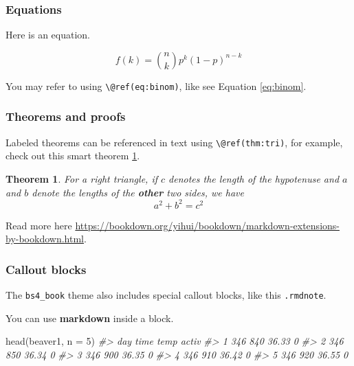 \documentclass[
]{bxjsbook}
\newenvironment{Shaded}{\begin{snugshade}}{\end{snugshade}}
\newcommand{\AttributeTok}[1]{\textcolor[rgb]{0.77,0.63,0.00}{#1}}
\newcommand{\CommentTok}[1]{\textcolor[rgb]{0.56,0.35,0.01}{\textit{#1}}}
\newcommand{\DecValTok}[1]{\textcolor[rgb]{0.00,0.00,0.81}{#1}}
\newcommand{\FunctionTok}[1]{\textcolor[rgb]{0.00,0.00,0.00}{#1}}
\newcommand{\NormalTok}[1]{#1}
\newtheorem{theorem}{Theorem}[section]
\theoremstyle{definition}
\theoremstyle{definition}
\theoremstyle{definition}
\theoremstyle{definition}
\theoremstyle{remark}
\begin{document}
\hypertarget{equations}{%
\subsubsection{Equations}\label{equations}}

Here is an equation.

\begin{equation} 
  f\left(k\right) = \binom{n}{k} p^k\left(1-p\right)^{n-k}
  \label{eq:binom}
\end{equation}

You may refer to using \texttt{\textbackslash{}@ref(eq:binom)}, like see Equation \eqref{eq:binom}.

\hypertarget{theorems-and-proofs}{%
\subsubsection{Theorems and proofs}\label{theorems-and-proofs}}

Labeled theorems can be referenced in text using \texttt{\textbackslash{}@ref(thm:tri)}, for example, check out this smart theorem \ref{thm:tri}.

\begin{theorem}
\protect\hypertarget{thm:tri}{}\label{thm:tri}For a right triangle, if \(c\) denotes the \emph{length} of the hypotenuse
and \(a\) and \(b\) denote the lengths of the \textbf{other} two sides, we have
\[a^2 + b^2 = c^2\]
\end{theorem}

Read more here \url{https://bookdown.org/yihui/bookdown/markdown-extensions-by-bookdown.html}.

\hypertarget{callout-blocks}{%
\subsubsection{Callout blocks}\label{callout-blocks}}

The \texttt{bs4\_book} theme also includes special callout blocks, like this \texttt{.rmdnote}.

You can use \textbf{markdown} inside a block.

\begin{Shaded}
\begin{Highlighting}[]
\FunctionTok{head}\NormalTok{(beaver1, }\AttributeTok{n =} \DecValTok{5}\NormalTok{)}
\CommentTok{\#\textgreater{}   day time  temp activ}
\CommentTok{\#\textgreater{} 1 346  840 36.33     0}
\CommentTok{\#\textgreater{} 2 346  850 36.34     0}
\CommentTok{\#\textgreater{} 3 346  900 36.35     0}
\CommentTok{\#\textgreater{} 4 346  910 36.42     0}
\CommentTok{\#\textgreater{} 5 346  920 36.55     0}
\end{Highlighting}
\end{Shaded}
\end{document}
